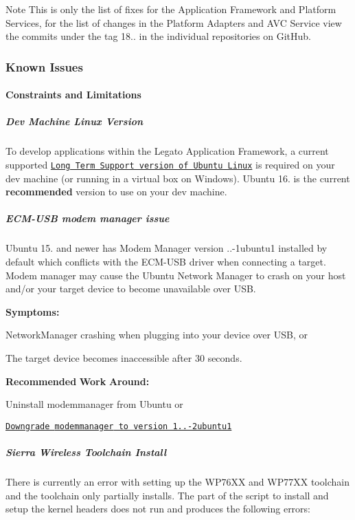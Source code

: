 \begin{DoxyNote}{Note}
This is only the list of fixes for the Application Framework and Platform Services, for the list of changes in the Platform Adapters and A\+VC Service view the commits under the tag 18.. in the individual repositories on Git\+Hub.
\end{DoxyNote}
\hypertarget{releaseNotes18030_rn1803_KnownIssues}{}\subsubsection{Known Issues}\label{releaseNotes18030_rn1803_KnownIssues}
\hypertarget{releaseNotes18030_rn1803_Constraints}{}\paragraph{Constraints and Limitations}\label{releaseNotes18030_rn1803_Constraints}
\hypertarget{releaseNotes18030_rn1803_ContraintsLinuxSupport}{}\subparagraph{Dev Machine Linux Version}\label{releaseNotes18030_rn1803_ContraintsLinuxSupport}
To develop applications within the Legato Application Framework, a current supported \href{https://www.ubuntu.com/info/release-end-of-life}{\tt Long Term Support version of Ubuntu Linux} is required on your dev machine (or running in a virtual box on Windows). Ubuntu 16. is the current {\bfseries recommended} version to use on your dev machine.\hypertarget{releaseNotes18030_rn1803_ConstECMUSB}{}\subparagraph{E\+C\+M-\/\+U\+S\+B modem manager issue}\label{releaseNotes18030_rn1803_ConstECMUSB}
Ubuntu 15. and newer has Modem Manager version {..-\/1ubuntu1} installed by default which conflicts with the E\+C\+M-\/\+U\+SB driver when connecting a target. Modem manager may cause the Ubuntu Network Manager to crash on your host and/or your target device to become unavailable over U\+SB.

{\bfseries Symptoms\+:} 
\begin{DoxyItemize}
\item Network\+Manager crashing when plugging into your device over U\+SB, or
\item The target device becomes inaccessible after 30 seconds.
\end{DoxyItemize}

{\bfseries Recommended} {\bfseries Work} {\bfseries Around\+:} 
\begin{DoxyItemize}
\item Uninstall {\ttfamily modemmanager} from Ubuntu or
\item \href{http://packages.ubuntu.com/trusty/modemmanager}{\tt Downgrade {\ttfamily modemmanager} to version 1..-\/2ubuntu1}
\end{DoxyItemize}\hypertarget{releaseNotes18030_rn1803_ConstraintsTC}{}\subparagraph{Sierra Wireless Toolchain Install}\label{releaseNotes18030_rn1803_ConstraintsTC}
There is currently an error with setting up the W\+P76\+XX and W\+P77\+XX toolchain and the toolchain only partially installs. The part of the script to install and setup the kernel headers does not run and produces the following errors\+:

